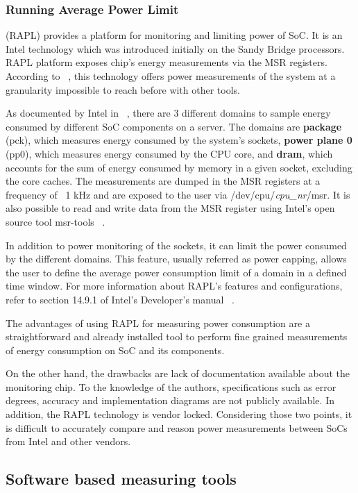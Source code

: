 \documentclass[a4paper]{jpconf}
\begin{document}
\subsubsection{Running Average Power Limit}
(RAPL) provides a platform for monitoring and 
limiting power of  SoC. It is an Intel technology which was 
introduced initially on the Sandy Bridge processors. RAPL platform exposes 
chip's energy measurements via the MSR registers. According to ~\cite{RAPL1}, 
this technology offers power measurements of the system at a granularity 
impossible to reach before with other tools.

As documented by Intel in ~\cite{INTELMAN}, there are 3 different domains to 
sample energy consumed by different SoC components on a server. The domains are
 \textbf{package} (pck), which measures energy consumed by the system's sockets, 
\textbf{power plane 0} (pp0), which measures energy consumed by the CPU core, and \textbf{dram}, which 
accounts for the sum of energy consumed by memory in a given socket, excluding 
the core caches. The measurements are dumped in the MSR registers at a 
frequency of ~1 kHz and are exposed to the user via /dev/cpu/\textit{cpu\_nr}/msr. It 
is also possible to read and write data from the MSR register using Intel’s 
open source tool msr-tools ~\cite{MSRTOOLS}. 

In addition to power monitoring of the sockets, it can limit the power consumed 
by the different domains. This feature, usually referred as power capping, 
allows the user to define the average power consumption limit of a domain in a 
defined time window. For more information about RAPL’s features and 
configurations, refer to section 14.9.1 of Intel’s Developer’s manual 
~\cite{INTELMAN}.

The advantages of using RAPL for measuring power consumption are a straightforward and already installed tool to perform fine grained measurements of energy consumption on SoC and its components.

On the other hand, the drawbacks are lack of documentation available about the monitoring chip. To the knowledge of the authors, specifications such as error degrees, accuracy and implementation diagrams are not publicly available. In addition, the RAPL technology is vendor locked. Considering those two points, it is difficult to accurately compare and reason power measurements between SoCs from Intel and other vendors.



\subsection{Software based measuring tools}
\end{document}
